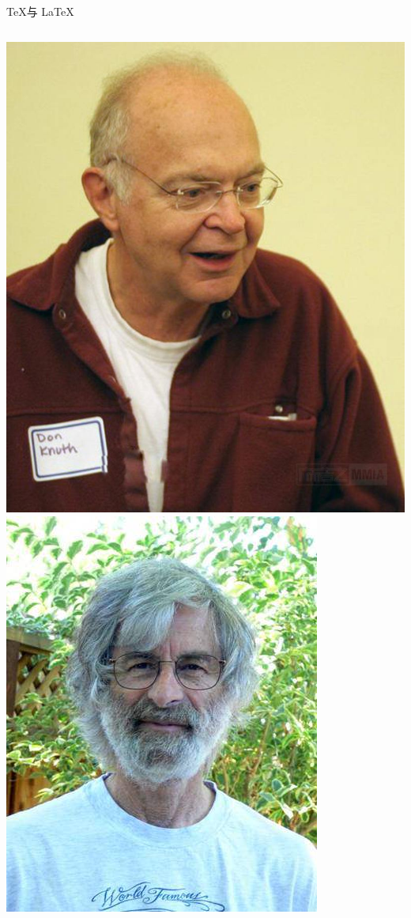 \documentclass[UTF8,11pt]{ctexbeamer}
\begin{document}
\begin{frame}{\TeX 与 \LaTeX}
\begin{columns}
	\includegraphics[scale=0.15]{figure/DK}\\
	\includegraphics[scale=0.28]{figure/LL}
	\end{columns}
\end{frame}
\end{document}

